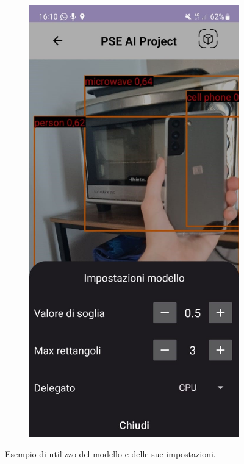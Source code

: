 \begin{figure}[H]
\begin{subfigure}[b]{0.3\textwidth}
  \end{subfigure}
  \begin{subfigure}[b]{0.3\textwidth}
    \includegraphics[width=\textwidth, height=0.45\textheight]{Immagini/App/funzionamento_impostazioni.jpeg}
  \end{subfigure}
  \caption{Esempio di utilizzo del modello e delle sue impostazioni.}
  \label{fig:funzionamento1}
\end{figure}

